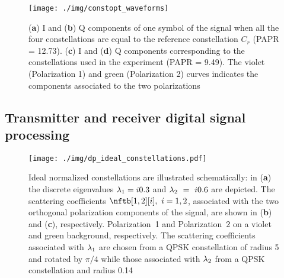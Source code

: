\begin{figure}[!t]
  \centering
  \texttt{[image: ./img/constopt\_waveforms]}

  \caption{(\textbf{a}) \ac{I} and (\textbf{b}) \ac{Q} components of one symbol of the signal when all the four constellations are equal to the reference constellation $C_r$ (\ac{PAPR} = 12.73). (\textbf{c})  \ac{I} and (\textbf{d}) \ac{Q} components  corresponding to the constellations used in the experiment (PAPR = 9.49). The violet (Polarization 1) and green (Polarization 2) curves indicates the components associated to the two polarizations}
  \label{fig:waveforms_const-opt}
\end{figure}



\subsection{Transmitter and receiver digital signal processing}

\begin{figure}[!t]
  \centering
  \texttt{[image: ./img/dp\_ideal\_constellations.pdf]}
  \caption{Ideal normalized constellations are illustrated schematically: in (\textbf{a}) the discrete eigenvalues $\eig[1] = i 0.3$ and $\eig[2]~=~i 0.6$ are depicted.
  The scattering coefficients $\nftb[1,2][i],~i=1,2$, associated with the two orthogonal polarization components of the signal, are shown in (\textbf{b}) and (\textbf{c}), respectively. Polarization~1 and Polarization~2 on a violet and green background, respectively. The scattering coefficients associated with $\eig[1]$ are chosen from a \ac{QPSK} constellation  of radius 5 and rotated by $\pi/4$ while those associated with $\eig[2]$ from a \ac{QPSK} constellation  and radius 0.14}
  \label{fig:idealconst}
\end{figure}


